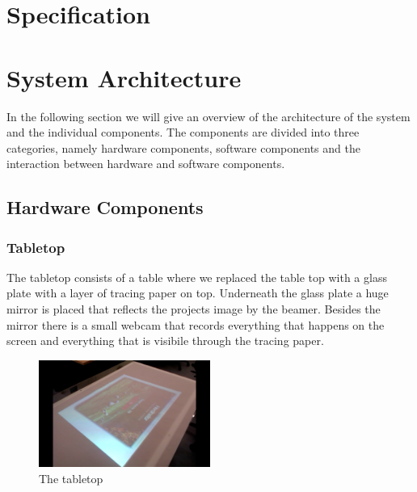\documentclass[a4paper,10pt]{article}
\begin{document}
\section{Specification}

\section{System Architecture}
\label{sec:system-architecture}
In the following section we will give an overview of the architecture of the system and the individual components.
The components are divided into three categories, namely hardware components, software components and the interaction between hardware and software components.

\subsection{Hardware Components}

\subsubsection{Tabletop}
The tabletop consists of a table where we replaced the table top with a glass plate with a layer of tracing paper on top.
Underneath the glass plate a huge mirror is placed that reflects the projects image by the beamer. 
Besides the mirror there is a small webcam that records everything that happens on the screen and everything that is visibile through the tracing paper. 

\begin{figure}[h!]
\caption{The tabletop}
\centering
\includegraphics[width=0.5\textwidth]{images/tabletop}
\end{figure}
\end{document}
